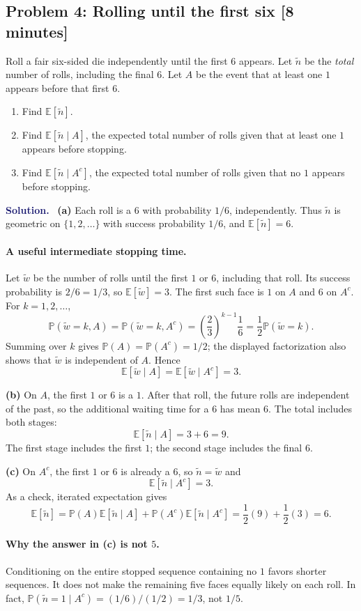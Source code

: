 \documentclass[11pt]{article}
\newcommand{\Pbb}{\mathbb{P}}
\newcommand{\E}{\mathbb{E}}
\newcommand{\rv}[1]{\widetilde{#1}}
\newenvironment{answer}{%
    \par\medskip\noindent\textcolor{MidnightBlue}{\textbf{Solution.}}\ }
    {\par\medskip}
\newcommand{\workingspace}[1]{}
\newcommand{\workingspace}[1]{\vspace{#1}}
\begin{document}
\newpage
\subsection*{Problem 4: Rolling until the first six \hfill [8 minutes]}
Roll a fair six-sided die independently until the first $6$ appears.
Let $\rv{n}$ be the \emph{total} number of rolls, including the final $6$.
Let $A$ be the event that at least one $1$ appears before that first $6$.
\begin{enumerate}
  \item Find $\E[\rv{n}]$.
  \item Find $\E[\rv{n}\mid A]$, the expected total number of rolls given
    that at least one $1$ appears before stopping.
  \item Find $\E[\rv{n}\mid A^c]$, the expected total number of rolls given
    that no $1$ appears before stopping.
\end{enumerate}
\workingspace{8cm}

\begin{answer}
\textbf{(a)} Each roll is a $6$ with probability $1/6$, independently.
Thus $\rv{n}$ is geometric on $\{1,2,\ldots\}$ with success probability
$1/6$, and $\boxed{\E[\rv{n}]=6}$.

\paragraph{A useful intermediate stopping time.}
Let $\rv{w}$ be the number of rolls until the first $1$ or $6$, including
that roll. Its success probability is $2/6=1/3$, so $\E[\rv{w}]=3$.
The first such face is $1$ on $A$ and $6$ on $A^c$.
For $k=1,2,\ldots$,
\[
  \Pbb(\rv{w}=k,A)=\Pbb(\rv{w}=k,A^c)
  =\left(\frac23\right)^{k-1}\frac16
  =\frac12\Pbb(\rv{w}=k).
\]
Summing over $k$ gives $\Pbb(A)=\Pbb(A^c)=1/2$; the displayed
factorization also shows that $\rv{w}$ is independent of $A$. Hence
\[
  \E[\rv{w}\mid A]=\E[\rv{w}\mid A^c]=3.
\]

\textbf{(b)} On $A$, the first $1$ or $6$ is a $1$. After that roll,
the future rolls are independent of the past, so the additional waiting
time for a $6$ has mean $6$. The total includes both stages:
\[
  \boxed{\E[\rv{n}\mid A]=3+6=9.}
\]
The first stage includes the first $1$; the second stage includes the final $6$.

\textbf{(c)} On $A^c$, the first $1$ or $6$ is already a $6$, so
$\rv{n}=\rv{w}$ and
\[
  \boxed{\E[\rv{n}\mid A^c]=3.}
\]
As a check, iterated expectation gives
\[
  \E[\rv{n}]
  =\Pbb(A)\E[\rv{n}\mid A]+\Pbb(A^c)\E[\rv{n}\mid A^c]
  =\frac12(9)+\frac12(3)=6.
\]

\paragraph{Why the answer in (c) is not $5$.}
Conditioning on the entire stopped sequence containing no $1$ favors
shorter sequences. It does not make the remaining five faces equally likely
on each roll. In fact,
$\Pbb(\rv{n}=1\mid A^c)=(1/6)/(1/2)=1/3$, not $1/5$.
\end{answer}
\end{document}
